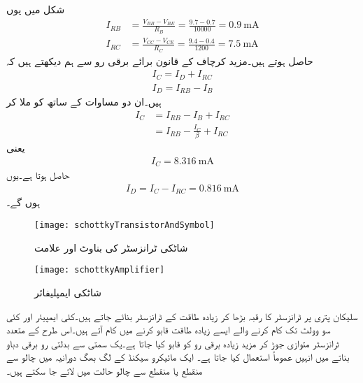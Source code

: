 شکل میں یوں
\begin{align*}
I_{RB}&=\frac{V_{BB}-V_{BE}}{R_B}=\frac{9.7-0.7}{10000}=\SI{0.9}{\milli \ampere}\\
I_{RC}&=\frac{V_{CC}-V_{CE}}{R_C}=\frac{9.4-0.4}{1200}=\SI{7.5}{\milli \ampere}
\end{align*}
حاصل ہوتے ہیں۔مزید کرچاف کے قانون برائے برقی رو سے ہم دیکھتے ہیں کہ
\begin{align*}
I_C=I_D+I_{RC}\\
I_D=I_{RB}-I_B
\end{align*}
ہیں۔ان دو مساوات کے ساتھ  کو ملا کر
\begin{align*}
I_C&=I_{RB}-I_B+I_{RC}\\
&=I_{RB}-\frac{I_C}{\beta}+I_{RC}
\end{align*}
یعنی
\begin{align*}
I_C=\SI{8.316}{\milli \ampere}
\end{align*}
حاصل ہوتا ہے۔یوں
\begin{align*}
I_D=I_C-I_{RC}=\SI{0.816}{\milli \ampere}
\end{align*}
ہوں گے۔
\begin{figure}
\centering
\texttt{[image: schottkyTransistorAndSymbol]}
\caption{شاٹکی ٹرانزسٹر کی بناوٹ اور علامت}
\label{شکل_ٹرانزسٹر_شاٹکی}
\end{figure}
%
\begin{figure}
\centering
\texttt{[image: schottkyAmplifier]}
\caption{شاٹکی ایمپلیفائر}
\label{شکل_ٹرانزسٹر_شاٹکی_ایمپلیفائر}
\end{figure}


سلیکان پتری پر ٹرانزسٹر کا رقبہ بڑھا کر زیادہ طاقت کے ٹرانزسٹر بنائے جاتے ہیں۔کئی ایمپیئر اور کئی سو وولٹ تک کام کرنے والے ایسے  زیادہ طاقت قابو کرنے میں کام آتے ہیں۔اس طرح کے متعدد ٹرانزسٹر متوازی جوڑ کر مزید زیادہ برقی رو کو قابو کیا جاتا ہے۔یک سمتی سے بدلتی رو برقی دباو بناتے  میں انہیں عموماً استعمال کیا جاتا ہے۔ ایک مائیکرو سیکنڈ کے لگ بھگ دورانیہ میں چالو سے منقطع یا منقطع سے چالو حالت میں لائے جا سکتے ہیں۔

